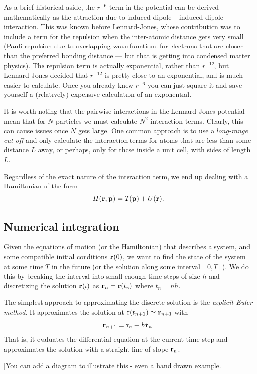\documentclass{article}
\begin{document}
As a brief historical aside, the $r^{-6}$ term in the potential can be derived mathematically as the attraction due to induced-dipole -- induced dipole interaction. This was known before Lennard-Jones, whose contribution was to include a term for the repulsion when the inter-atomic distance gets very small (Pauli repulsion due to overlapping wave-functions for electrons that are closer than the preferred bonding distance --- but that is getting into condensed matter physics). The repulsion term is actually exponential, rather than $r^{-12}$, but Lennard-Jones decided that $r^{-12}$ is pretty close to an exponential, and is much easier to calculate. Once you already know $r^{-6}$ you can just square it and save yourself a (relatively) expensive calculation of an exponential.

It is worth noting that the pairwise interactions in the Lennard-Jones potential mean that for $N$ particles we must calculate $N^2$ interaction terms. Clearly, this can cause issues once $N$ gets large. One common approach is to use a \emph{long-range cut-off} and only calculate the interaction terms for atoms that are less than some distance $L$ away, or perhaps, only for those inside a unit cell, with sides of length $L$.

Regardless of the exact nature of the interaction term, we end up dealing with a Hamiltonian of the form 
$$
	H({\bf r},{\bf p}) = T({\bf p}) + U({\bf r}).
$$

\subsection*{Numerical integration}
Given the equations of motion (or the Hamiltonian) that describes a system, and some compatible initial conditions ${\bf r}(0)$, we want to find the state of the system at some time $T$ in the future (or the solution along some interval $[0,T]$). We do this by breaking the interval into small enough time steps of size $h$ and discretizing the solution ${\bf r}(t)$ as ${\bf r}_n = {\bf r}(t_n) $ where $t_n = nh$.

The simplest approach to approximating the discrete solution is the \emph{explicit Euler method}. It approximates the solution at ${\bf r}(t_{n+1})\simeq {\bf r}_{n+1}$ with
$$
	{\bf r}_{n+1} = {\bf r}_n + h \dot{\bf r}_n.
$$
That is, it evaluates the differential equation at the current time step and approximates the solution with a straight line of slope $\dot{\bf r}_n$. 

[You can add a diagram to illustrate this - even a hand drawn example.]
\end{document}
